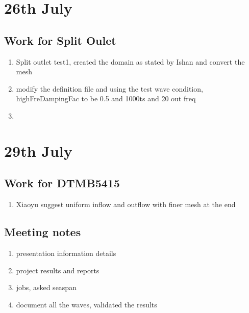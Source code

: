 \documentclass[12pt]{article} %
\begin{document}
\section{26th July}
\subsection{Work for Split Oulet}
\begin{enumerate}
    \item Split outlet test1, created the domain as stated by Ishan and convert the mesh
    \item modify the definition file and using the test wave condition, highFreDampingFac to be 0.5 and 1000ts and 20 out freq
    \item  
\end{enumerate}
\section{29th July}
\subsection{Work for DTMB5415}
\begin{enumerate}
    \item Xiaoyu suggest uniform inflow and outflow with finer mesh at the end
\end{enumerate}
\subsection{Meeting notes}
\begin{enumerate}
    \item presentation information details
    \item project results and reports
    \item jobs, asked seaspan
    \item document all the waves, validated the results
\end{enumerate}
\end{document}
